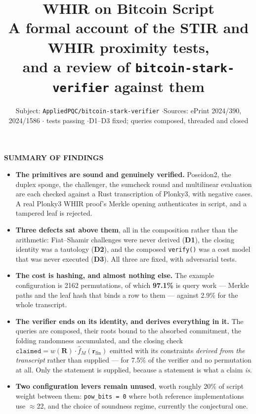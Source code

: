 \documentclass[11pt,a4paper]{article}
\title{\vspace{-2em}\textbf{WHIR on Bitcoin Script}\\[0.35em]
  {\large\normalfont A formal account of the STIR and WHIR proximity tests,\\
  and a review of \texttt{bitcoin-stark-verifier} against them}}
\author{}
\date{\small Subject: \texttt{AppliedPQC/bitcoin-stark-verifier}
  \quad$\cdot$\quad Sources: ePrint 2024/390, 2024/1586
  \quad$\cdot$\quad 98 tests passing
  \quad$\cdot$\quad D1--D3 fixed; queries composed, threaded and closed}
\begin{document}
\maketitle
\thispagestyle{empty}

\begin{center}
\begin{minipage}{0.94\linewidth}
\small
\noindent{\color{accent}\rule{\linewidth}{1pt}}\par\vspace{0.4em}
\noindent\textbf{\sffamily\footnotesize SUMMARY OF FINDINGS}\par\vspace{0.5em}
\begin{itemize}[leftmargin=1.2em]
  \item \textbf{The primitives are sound and genuinely verified.} Poseidon2, the duplex sponge, the
  challenger, the sumcheck round and multilinear evaluation are each checked against a Rust
  transcription of Plonky3, with negative cases. A real Plonky3 WHIR proof's Merkle opening
  authenticates in script, and a tampered leaf is rejected.
  \item \textbf{Three defects sat above them}, all in the composition rather than the arithmetic:
  Fiat--Shamir challenges were never derived (\textbf{D1}), the closing identity was a tautology
  (\textbf{D2}), and the composed \texttt{verify()} was a cost model that was never executed
  (\textbf{D3}). All three are fixed, with adversarial tests.
  \item \textbf{The cost is hashing, and almost nothing else.} The example configuration is 2162
  permutations, of which \textbf{97.1\%} is query work --- Merkle paths and the leaf hash that binds
  a row to them --- against 2.9\% for the whole transcript.
  \item \textbf{The verifier ends on its identity, and derives everything in it.} The queries are
  composed, their roots bound to the absorbed commitment, the folding randomness accumulated, and
  the closing check $\texttt{claimed} = w(\boldsymbol R)\cdot\hat f_{M}(\boldsymbol
  r_{\mathrm{fin}})$ emitted with its constraints \emph{derived from the transcript} rather than
  supplied --- for 7.5\% of the verifier and no permutation at all. Only the statement is supplied,
  because a statement is what a claim \emph{is}.
  \item \textbf{Two configuration levers remain unused}, worth roughly 20\% of script weight
  between them: \texttt{pow\_bits = 0} where both reference implementations use $\approx$22, and
  the choice of soundness regime, currently the conjectural one.
\end{itemize}
\vspace{0.3em}\noindent{\color{accent}\rule{\linewidth}{1pt}}
\end{minipage}
\end{center}
\end{document}
